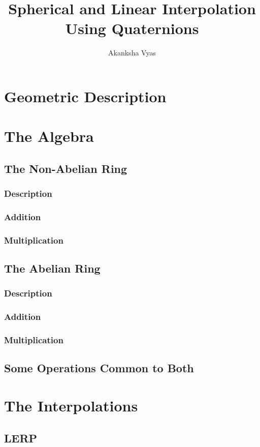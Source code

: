 \documentclass{article}[12pt]
\title{\Large{Spherical and Linear Interpolation Using Quaternions}}
\author{Akanksha Vyas}
\begin{document}
\maketitle
\section*{Geometric Description}
\section*{The Algebra}
\subsection*{The Non-Abelian Ring}
\subsubsection*{Description}
\subsubsection*{Addition}
\subsubsection*{Multiplication}
\subsection*{The Abelian Ring}
\subsubsection*{Description}
\subsubsection*{Addition}
\subsubsection*{Multiplication}
\subsection*{Some Operations Common to Both}
\section*{The Interpolations}
\subsection*{LERP}
\end{document}
